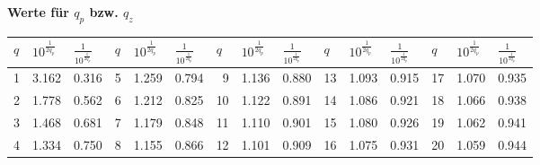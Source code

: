 \textbf{Werte für $q_p$ bzw. $q_z$}\\
\renewcommand{\arraystretch}{1.5}
\begin{tabular}{|r|r|r||r|r|r||r|r|r||r|r|r||r|r|r|}
\hline
\multicolumn{1}{|l|}{$q$} & \multicolumn{1}{l|}{$10^{\frac{1}{2 q_p}}$} & 
\multicolumn{1}{l||}{$\frac{1}{10^{\frac{1}{2 q_p}}}$} &
\multicolumn{1}{l|}{$q$} & \multicolumn{1}{l|}{$10^{\frac{1}{2 q_p}}$} &
\multicolumn{1}{l||}{$\frac{1}{10^{\frac{1}{2 q_p}}}$} &
\multicolumn{1}{l|}{$q$} & \multicolumn{1}{l|}{$10^{\frac{1}{2 q_p}}$} & \multicolumn{1}{l||}{$\frac{1}{10^{\frac{1}{2 q_p}}}$} & \multicolumn{1}{l|}{$q$} & \multicolumn{1}{l|}{$10^{\frac{1}{2 q_p}}$} & \multicolumn{1}{l||}{$\frac{1}{10^{\frac{1}{2 q_p}}}$} & \multicolumn{1}{l|}{$q$} & \multicolumn{1}{l|}{$10^{\frac{1}{2 q_p}}$} & \multicolumn{1}{l|}{$\frac{1}{10^{\frac{1}{2 q_p}}}$} \\ \hline
\hline
1 & 3.162 & 0.316 & 5 & 1.259 & 0.794 & 9 & 1.136 & 0.880 & 13 & 1.093 & 0.915 & 17 & 1.070 & 0.935 \\ \hline
2 & 1.778 & 0.562 & 6 & 1.212 & 0.825 & 10 & 1.122 & 0.891 & 14 & 1.086 & 0.921 & 18 & 1.066 & 0.938 \\ \hline
3 & 1.468 & 0.681 & 7 & 1.179 & 0.848 & 11 & 1.110 & 0.901 & 15 & 1.080 & 0.926 & 19 & 1.062 & 0.941 \\ \hline
4 & 1.334 & 0.750 & 8 & 1.155 & 0.866 & 12 & 1.101 & 0.909 & 16 & 1.075 & 0.931 & 20 & 1.059 & 0.944 \\ \hline
\end{tabular}
\renewcommand{\arraystretch}{1}\\


